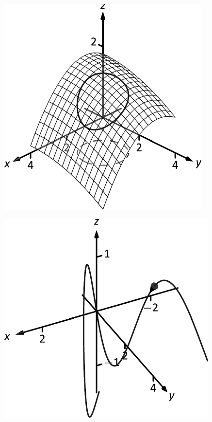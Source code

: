 \documentclass[10pt]{article}
\begin{document}
\includegraphics{figmchain_intro_3DBW.pdf}
\texttt{}

\includegraphics{figmotion6_3DBW.pdf}
\texttt{}
\end{document}
